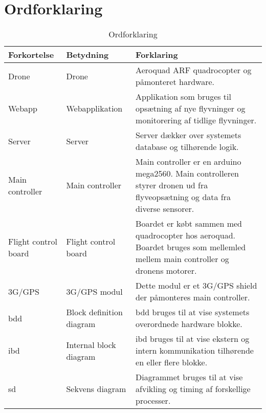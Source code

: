 \section{Ordforklaring}
\begin{table}[H]
	\centering
		\begin{tabular}{|p{2.6cm}|p{4.5 cm}|p{6.5 cm}|} 
		\hline
			\textbf{Forkortelse} & \textbf{Betydning} & \textbf{Forklaring} \\ \hline
			 Drone & Drone & Aeroquad ARF quadrocopter og \newline påmonteret hardware. \\ \hline
			 Webapp & Webapplikation & Applikation som bruges til opsætning af nye flyvninger og monitorering af tidlige flyvninger. \\ \hline
			 Server & Server & Server dækker over systemets database og tilhørende logik. \\ \hline
			 Main controller & Main controller  & Main controller er en arduino mega2560. Main controlleren styrer dronen ud fra flyveopsætning og data fra diverse sensorer.   \\ \hline
			 Flight control \newline board & Flight control board  & Boardet er købt sammen med quadrocopter hos aeroquad. Boardet bruges som mellemled mellem main controller og dronens motorer.  \\ \hline
			 3G/GPS & 3G/GPS modul  & Dette modul er et 3G/GPS shield der påmonteres main controller.  \\ \hline
			 bdd& Block definition diagram  & bdd bruges til at vise systemets overordnede hardware blokke.  \\ \hline
			 ibd& Internal block diagram & ibd bruges til at vise ekstern og intern kommunikation tilhørende en eller flere blokke. \\ \hline
			 sd& Sekvens diagram & Diagrammet bruges til at vise afvikling og timing af forskellige processer. \\ \hline			 
		\end{tabular}
	\caption{Ordforklaring}
\end{table}

\newpage
